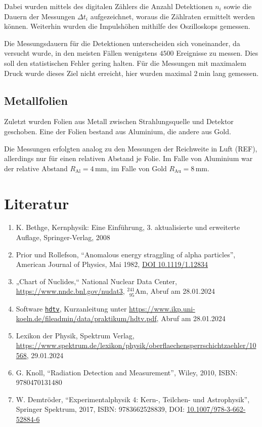 \documentclass[12pt,a4paper]{scrartcl}
\numberwithin{equation}{section} %
\renewcommand{\[}{} %
\renewcommand{\]}{\noindent} %
\newcommand{\tightlist}{} %
\begin{document}
Dabei wurden mittels des digitalen Zählers die Anzahl Detektionen
\(n_i\) sowie die Dauern der Messungen \(\Delta t_i\) aufgezeichnet,
woraus die Zählraten ermittelt werden können. Weiterhin wurden die
Impulshöhen mithilfe des Oszilloskops gemessen.

Die Messungsdauern für die Detektionen unterscheiden sich voneinander,
da versucht wurde, in den meisten Fällen wenigstens \(4500\) Ereignisse
zu messen. Dies soll den statistischen Fehler gering halten. Für die
Messungen mit maximalem Druck wurde dieses Ziel nicht erreicht, hier
wurden maximal \(2\mathrm{\,min}\) lang gemessen.

\hypertarget{metallfolien}{%
\subsection{Metallfolien}\label{metallfolien}}

Zuletzt wurden Folien aus Metall zwischen Strahlungsquelle und Detektor
geschoben. Eine der Folien bestand aus Aluminium, die andere aus Gold.

Die Messungen erfolgten analog zu den Messungen der Reichweite in Luft
(REF), allerdings nur für einen relativen Abstand je Folie. Im Falle von
Aluminium war der relative Abstand \(R_\mathrm{Al}=4\mathrm{\,mm}\), im
Falle von Gold \(R_\mathrm{Au}=8\mathrm{\,mm}\).

\hypertarget{literatur}{%
\section{Literatur}\label{literatur}}

\begin{enumerate}
\def\labelenumi{\arabic{enumi}.}
\tightlist
\item
  K. Bethge, Kernphysik: Eine Einführung, 3. aktualisierte und
  erweiterte Auflage, Springer-Verlag, 2008
\item
  Prior und Rollefson, ``Anomalous energy straggling of alpha
  particles'', American Journal of Physics, Mai 1982,
  \href{https://doi.org/10.1119/1.12834}{DOI 10.1119/1.12834}
\item
  „Chart of Nuclides,`` National Nuclear Data Center,
  \url{https://www.nndc.bnl.gov/nudat3}, \(^{241}_{\ \ 95}\mathrm{Am}\),
  Abruf am 28.01.2024
\item
  Software \href{https://pypi.org/project/hdtv}{\texttt{hdtv}},
  Kurzanleitung unter
  \url{https://www.ikp.uni-koeln.de/fileadmin/data/praktikum/hdtv.pdf},
  Abruf am 28.01.2024
\item
  Lexikon der Physik, Spektrum Verlag,
  \url{https://www.spektrum.de/lexikon/physik/oberflaechensperrschichtzaehler/10568},
  29.01.2024
\item
  G. Knoll, ``Radiation Detection and Measurement'', Wiley, 2010, ISBN:
  9780470131480
\item
  W. Demtröder, ``Experimentalphysik 4: Kern-, Teilchen- und
  Astrophysik'', Springer Spektrum, 2017, ISBN: 9783662528839, DOI:
  \href{https://doi.org/10.1007/978-3-662-52884-6}{10.1007/978-3-662-52884-6}
\end{enumerate}
\end{document}
